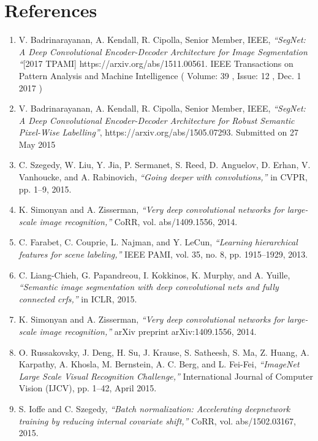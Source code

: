 \documentclass[a4paper,12pt]{article}
\begin{document}
\section{References}
\setlength{\parindent}{4em}
\setlength{\parskip}{1em}
\begin{enumerate}

\item \hypertarget{1}{V. Badrinarayanan, A. Kendall, R. Cipolla, Senior Member, IEEE,\textit{ “SegNet: A Deep Convolutional Encoder-Decoder Architecture for Image Segmentation “}[2017 TPAMI] https://arxiv.org/abs/1511.00561. IEEE Transactions on Pattern Analysis and Machine Intelligence ( Volume: 39 , Issue: 12 , Dec. 1 2017 )}
\item \hypertarget{2}{V. Badrinarayanan, A. Kendall, R. Cipolla, Senior Member, IEEE, \textit{“SegNet: A Deep Convolutional Encoder-Decoder Architecture for Robust Semantic Pixel-Wise Labelling”}, https://arxiv.org/abs/1505.07293. Submitted on 27 May 2015}
\item \hypertarget{3}{C. Szegedy, W. Liu, Y. Jia, P. Sermanet, S. Reed, D. Anguelov, D. Erhan, V. Vanhoucke, and A. Rabinovich, \textit{“Going deeper with convolutions,”} in CVPR, pp. 1–9, 2015.}
\item \hypertarget{4}{K. Simonyan and A. Zisserman, \textit{“Very deep convolutional networks for large-scale image recognition,”} CoRR, vol. abs/1409.1556, 2014.}
\item \hypertarget{5}{C. Farabet, C. Couprie, L. Najman, and Y. LeCun, \textit{“Learning hierarchical features for scene labeling,”} IEEE PAMI, vol. 35, no. 8, pp. 1915–1929, 2013.}
\item \hypertarget{6}{C. Liang-Chieh, G. Papandreou, I. Kokkinos, K. Murphy, and A. Yuille, \textit{“Semantic image segmentation with deep convolutional nets and fully connected crfs,”} in ICLR, 2015.}
\item \hypertarget{7}{K. Simonyan and A. Zisserman, \textit{“Very deep convolutional networks for large-scale image recognition,”} arXiv preprint arXiv:1409.1556, 2014.}
\item \hypertarget{8}{O. Russakovsky, J. Deng, H. Su, J. Krause, S. Satheesh, S. Ma, Z. Huang, A. Karpathy, A. Khosla, M. Bernstein, A. C. Berg, and L. Fei-Fei, \textit{“ImageNet Large Scale Visual Recognition Challenge,”} International Journal of Computer Vision (IJCV), pp. 1–42, April 2015.}
\item \hypertarget{9}{S. Ioffe and C. Szegedy, \textit{“Batch normalization: Accelerating deepnetwork training by reducing internal covariate shift,”} CoRR, vol. abs/1502.03167, 2015.}

\end{enumerate}
\end{document}
